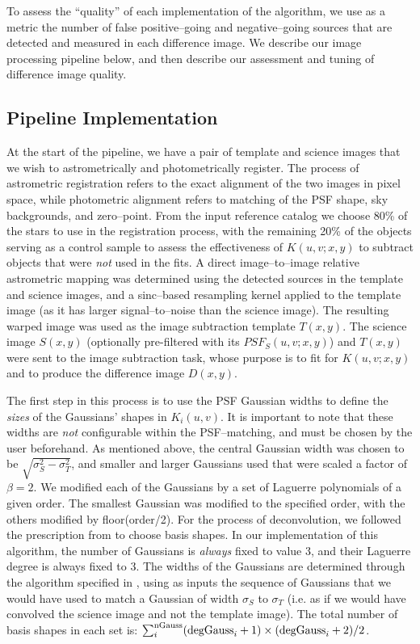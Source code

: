 \documentclass[floatfix, apj]{emulateapj}
\begin{document}
To assess the ``quality'' of each implementation of the algorithm, we use as a metric the number of false positive--going and negative--going sources that are detected and measured in each difference image.  We describe our image processing pipeline below, and then describe our assessment and tuning of difference image quality.


\subsection{Pipeline Implementation}

At the start of the pipeline, we have a pair of template and science images that we wish to astrometrically and photometrically register.
The process of astrometric registration refers to the exact alignment of the two images in pixel space, while photometric alignment refers to matching of the PSF shape, sky backgrounds, and zero--point.
From the input reference catalog we choose 80\% of the stars to use in the registration process, with the remaining 20\% of the objects serving as a control sample to assess
the effectiveness of $K(u,v;x,y)$ to subtract objects that were {\it not} used in the fits.
A direct image--to--image relative astrometric mapping was determined using the detected sources in the template and science images, and a sinc--based resampling kernel applied to the template image (as it has larger signal--to--noise than the science image).
The resulting warped image was used as the image subtraction template $T(x,y)$.
The science image $S(x,y)$ (optionally pre-filtered with its $PSF_S(u,v;x,y)$) and $T(x,y)$ were sent to the image subtraction task, whose purpose is to fit for $K(u,v;x,y)$ and to produce the difference image $D(x,y)$.

The first step in this process is to use the PSF Gaussian widths to define the {\it sizes} of the Gaussians' shapes in $K_i(u,v)$.
It is important to note that these widths are {\it not} configurable within the PSF--matching, and must be chosen by the user beforehand.
As mentioned above, the central Gaussian width was chosen to be $\sqrt{\sigma_S^2 - \sigma_T^2}$, and smaller and larger Gaussians used that were scaled a factor of $\beta = 2$.
We modified each of the Gaussians by a set of Laguerre polynomials of a given order.
The smallest Gaussian was modified to the specified order, with the others modified by floor(order/2).
For the process of deconvolution, we followed the prescription from \cite{0266-5611-26-8-085002} to choose basis shapes.
In our implementation of this algorithm, the number of Gaussians is {\it always} fixed to value 3, and their Laguerre degree is always fixed to 3.
The  widths of the Gaussians are determined through the algorithm specified in \cite{0266-5611-26-8-085002}, using as inputs the sequence of Gaussians that we would have used to match a Gaussian of
  width $\sigma_S$ to $\sigma_T$ (i.e. as if we would have convolved the science image and not the template image).
The total number of basis shapes in each set is: $\sum_i^{\rm nGauss} ({\rm degGauss}_i+1)\times({\rm degGauss}_i+2)/2$.
\end{document}
